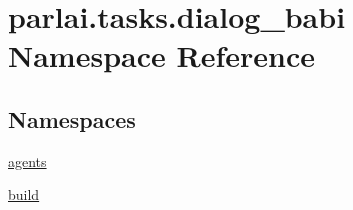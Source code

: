 \hypertarget{namespaceparlai_1_1tasks_1_1dialog__babi}{}\section{parlai.\+tasks.\+dialog\+\_\+babi Namespace Reference}
\label{namespaceparlai_1_1tasks_1_1dialog__babi}
\subsection*{Namespaces}
\begin{DoxyCompactItemize}
\item 
 \hyperlink{namespaceparlai_1_1tasks_1_1dialog__babi_1_1agents}{agents}
\item 
 \hyperlink{namespaceparlai_1_1tasks_1_1dialog__babi_1_1build}{build}
\end{DoxyCompactItemize}
